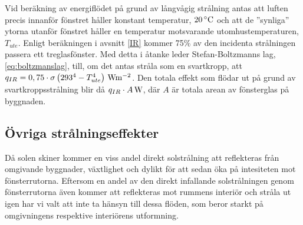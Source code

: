 Vid beräkning av energiflödet på grund av långvågig strålning antas att luften precis innanför fönstret håller konstant temperatur, $\unit[20]{^{\circ}C}$ och att de ''synliga'' ytorna utanför fönstret håller en temperatur motsvarande utomhustemperaturen, $T_{ute}$. Enligt beräkningen i avsnitt \ref{IR} kommer 75\% av den incidenta strålningen passera ett treglasfönster. Med detta i åtanke leder Stefan-Boltzmanns lag, \eqref{eq:boltzmanslag}, till, om det antas stråla som en svartkropp, att $q_{IR} = 0,75 \cdot \sigma \unit[\left( 293^4 - T_{ute}^4\right)]{Wm^{-2}}$. Den totala effekt som flödar ut på grund av svartkroppsstrålning blir då $\unit[q_{IR}\cdot A]{W}$, där $A$ är totala arean av fönsterglas på byggnaden.

\subsection{Övriga strålningseffekter}\label{subsec:otherradiation}

Då solen skiner kommer en viss andel direkt solstrålning att reflekteras från omgivande byggnader, växtlighet och dylikt för att sedan öka på intesiteten mot fönsterrutorna. Eftersom en andel av den direkt infallande solstrålningen genom fönsterrutorna även kommer att reflekteras mot rummens interiör och stråla ut igen har vi valt att inte ta hänsyn till dessa flöden, som beror starkt på omgivningens respektive interiörens utformning.

